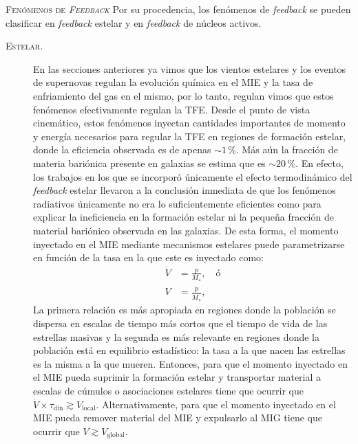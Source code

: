 \documentclass[xcolor=dvipsnames,4pt,hyperref={colorlinks,citecolor=black,linkcolor=black,urlcolor=black}]{beamer}
\begin{document}
\begin{frame}[allowframebreaks]{\textsc{Fenómenos de \emph{Feedback}}}
Por su procedencia, los fenómenos de \emph{feedback} se pueden clasificar en \emph{feedback} estelar
y en \emph{feedback} de núcleos activos.
%
\begin{description}
%
\item[\textsc{Estelar.}] En las secciones anteriores ya vimos que los vientos estelares y los
eventos de supernovas regulan la evolución química en el MIE y la tasa de enfriamiento del gas en el
mismo, por lo tanto, regulan vimos que estos fenómenos efectivamente regulan la TFE. Desde el punto
de vista cinemático, estos fenómenos inyectan cantidades importantes de momento y energía necesarios
para regular la TFE en regiones de formación estelar, donde la eficiencia observada es de apenas
$\sim1\,\%$. Más aún la fracción de materia bariónica presente en galaxias se estima que es
$\sim20\,\%$. En efecto, los trabajos en los que se incorporó únicamente el efecto termodinámico del
\emph{feedback} estelar llevaron a la conclusión inmediata de que los fenómenos radiativos
únicamente no era lo suficientemente eficientes como para explicar la ineficiencia en la formación
estelar ni la pequeña fracción de material bariónico observada en las galaxias. De esta forma, el
momento inyectado en el MIE mediante mecanismos estelares puede parametrizarse en función de la
tasa en la que este es inyectado como:
%
\begin{align}
\dot{V} &= \frac{\dot{p}}{M_\star},\quad\text{ó}\nonumber\\
V       &= \frac{\dot{p}}{\dot{M}_\star},\nonumber
\end{align}
%
La primera relación es más apropiada en regiones donde la población se dispersa en escalas de tiempo
más cortos que el tiempo de vida de las estrellas masivas y la segunda es más relevante en regiones
donde la población está en equilibrio estadístico: la tasa a la que nacen las estrellas es la misma
a la que mueren. Entonces, para que el momento inyectado en el MIE pueda suprimir la formación
estelar y transportar material a escalas de cúmulos o asociaciones estelares tiene que ocurrir que
$\dot{V}\times\tau_\text{din}\gtrsim V_\text{local}$. Alternativamente, para que el momento
inyectado en el MIE pueda remover material del MIE y expulsarlo al MIG tiene que ocurrir que
$V\gtrsim V_\text{global}$.


\end{description}
\end{frame}
\end{document}
